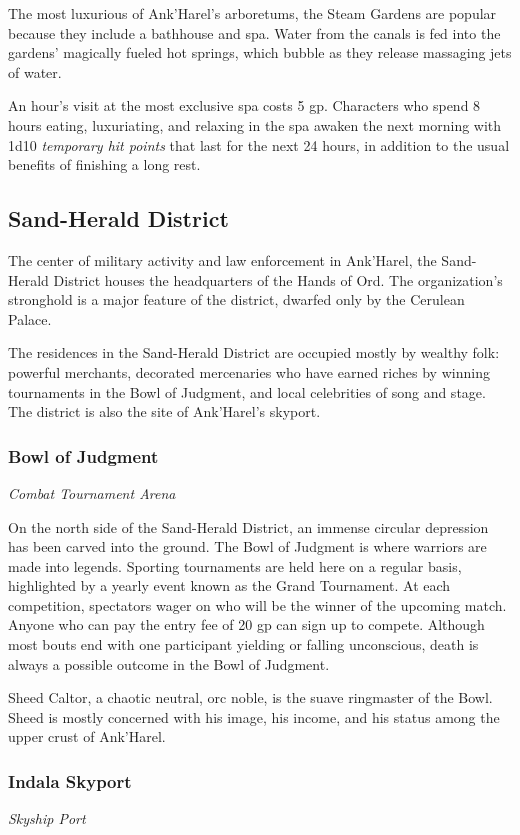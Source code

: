 \documentclass[10pt,a4paper,twoside,bg=print,twocolumn,openany,nodeprecatedcode]{dndbook}
\begin{document}
The most luxurious of Ank'Harel's arboretums, the Steam Gardens are popular because they include a bathhouse and spa. Water from the canals is fed into the gardens' magically fueled hot springs, which bubble as they release massaging jets of water.

An hour's visit at the most exclusive spa costs 5 gp. Characters who spend 8 hours eating, luxuriating, and relaxing in the spa awaken the next morning with 1d10 \textit{temporary hit points} that last for the next 24 hours, in addition to the usual benefits of finishing a long rest.

\subsection{Sand-Herald District}
The center of military activity and law enforcement in Ank'Harel, the Sand-Herald District houses the headquarters of the Hands of Ord. The organization's stronghold is a major feature of the district, dwarfed only by the Cerulean Palace.

The residences in the Sand-Herald District are occupied mostly by wealthy folk: powerful merchants, decorated mercenaries who have earned riches by winning tournaments in the Bowl of Judgment, and local celebrities of song and stage. The district is also the site of Ank'Harel's skyport.

\subsubsection{Bowl of Judgment}
\textit{Combat Tournament Arena}

On the north side of the Sand-Herald District, an immense circular depression has been carved into the ground. The Bowl of Judgment is where warriors are made into legends. Sporting tournaments are held here on a regular basis, highlighted by a yearly event known as the Grand Tournament. At each competition, spectators wager on who will be the winner of the upcoming match. Anyone who can pay the entry fee of 20 gp can sign up to compete. Although most bouts end with one participant yielding or falling unconscious, death is always a possible outcome in the Bowl of Judgment.

Sheed Caltor, a chaotic neutral, orc noble, is the suave ringmaster of the Bowl. Sheed is mostly concerned with his image, his income, and his status among the upper crust of Ank'Harel.

\subsubsection{Indala Skyport}
\textit{Skyship Port}
\end{document}
